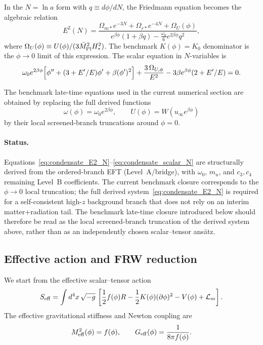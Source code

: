 \documentclass[11pt,a4paper]{article}
\numberwithin{equation}{section}
\begin{document}
In the $N=\ln a$ form with $q\equiv d\phi/dN$, the Friedmann equation
becomes the algebraic relation
\begin{equation}
\boxed{
E^2(N)=
\frac{
\Omega_{m*}e^{-3N}
+\Omega_{r*}e^{-4N}
+\Omega_U(\phi)
}{
e^{\beta\phi}(1+\beta q)
-\tfrac{\omega_0}{6}e^{2\beta\phi}q^2
}},
\label{eq:condensate_E2_N}
\end{equation}
where $\Omega_U(\phi)\equiv U(\phi)/(3\bar M_{\rm Pl}^2 H_*^2)$.
The benchmark $K(\phi)=K_0$ denominator is the $\phi\to 0$ limit
of this expression.
The scalar equation in $N$-variables is
\begin{equation}
\omega_0 e^{2\beta\phi}
\Bigl[
\phi''+(3+E'/E)\phi'+\beta(\phi')^2
\Bigr]
+
\frac{3\,\Omega_{U,\phi}}{E^2}
-3\beta e^{\beta\phi}(2+E'/E)=0.
\label{eq:condensate_scalar_N}
\end{equation}

The benchmark late-time equations used in the current numerical section
are obtained by replacing the full derived functions
\[
\omega(\phi)=\omega_0 e^{2\beta\phi},
\qquad
U(\phi)=W(u_\infty e^{\beta\phi})
\]
by their local screened-branch truncations around $\phi=0$.

\paragraph{Status.}
Equations~\eqref{eq:condensate_E2_N}--\eqref{eq:condensate_scalar_N}
are structurally derived from the ordered-branch EFT (Level~A/bridge),
with $\omega_0$, $m_u$, and $c_3,c_4$ remaining Level~B coefficients.
The current benchmark closure corresponds to the $\phi\to 0$ local
truncation; the full derived system~\eqref{eq:condensate_E2_N} is
required for a self-consistent high-$z$ background branch
that does not rely on an interim matter+radiation tail.
The benchmark late-time closure introduced below should therefore be read
as the local screened-branch truncation of the derived system above,
rather than as an independently chosen scalar--tensor ans\"{a}tz.

\subsection{Effective action and FRW reduction}

We start from the effective scalar--tensor action
\begin{equation}
S_{\rm eff}
=
\int d^4x\,\sqrt{-g}\,
\left[
\frac12 f(\phi)R
-\frac12 K(\phi)(\partial\phi)^2
-V(\phi)
+\mathcal L_m
\right].
\label{eq:app_late_action}
\end{equation}
The effective gravitational stiffness and Newton coupling are
\begin{equation}
M_{\rm eff}^2(\phi)=f(\phi),
\qquad
G_{\rm eff}(\phi)=\frac{1}{8\pi f(\phi)}.
\label{eq:app_late_geff}
\end{equation}
\end{document}
